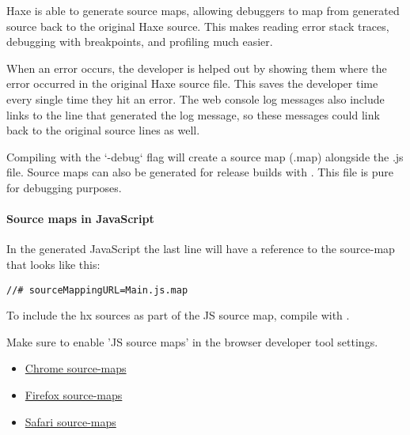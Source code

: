 Haxe is able to generate source maps, allowing debuggers to map from generated source back to the original Haxe source. This makes reading error stack traces, debugging with breakpoints, and profiling much easier.

When an error occurs, the developer is helped out by showing them where the error occurred in the original Haxe source file. This saves the developer time every single time they hit an error. The web console log messages also include links to the line that generated the log message, so these messages could link back to the original source lines as well. 

Compiling with the `-debug` flag will create a source map (.map) alongside the .js file. Source maps can also be generated for release builds with . This file is pure for debugging purposes. 

\paragraph{Source maps in JavaScript}

In the generated JavaScript the last line will have a reference to the source-map that looks like this:

\begin{lstlisting}
//# sourceMappingURL=Main.js.map
\end{lstlisting}

To include the hx sources as part of the JS source map, compile with .

Make sure to enable 'JS source maps' in the browser developer tool settings. 

\begin{itemize}
	\item \href{https://developers.google.com/web/tools/chrome-devtools/debug/readability/source-maps}{Chrome source-maps}
	\item \href{https://developer.mozilla.org/en-US/docs/Tools/Debugger/How_to/Use_a_source_map}{Firefox source-maps}
	\item \href{https://developer.apple.com/library/safari/documentation/AppleApplications/Conceptual/Safari_Developer_Guide/ResourcesandtheDOM/ResourcesandtheDOM.html#//apple_ref/doc/uid/TP40007874-CH3-SW2}{Safari source-maps}
\end{itemize}
